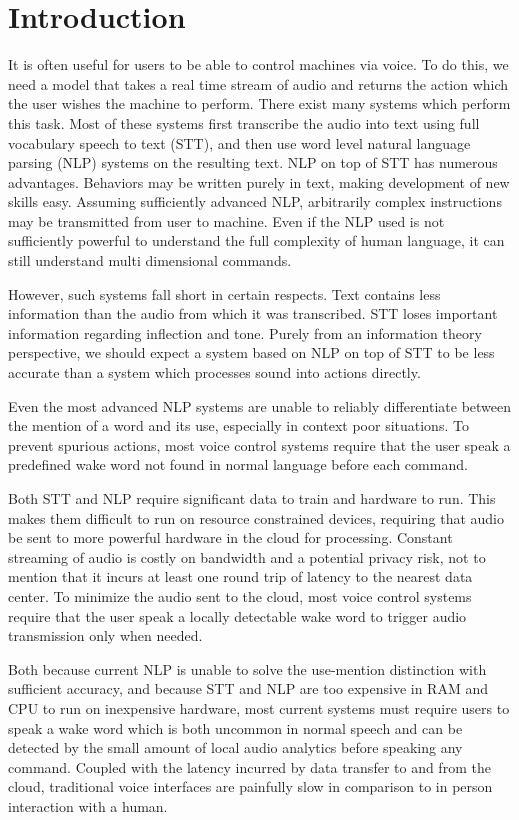 \documentclass[conference]{IEEEtran}
\begin{document}
\section{Introduction}
It is often useful for users to be able to control machines via voice.
To do this, we need a model that takes a real time stream of audio and returns the action which the user wishes the machine to perform.
There exist many systems which perform this task\cite{b1}\cite{b2}\cite{b3}.
Most of these systems first transcribe the audio into text using full vocabulary speech to text (STT),
and then use word level natural language parsing (NLP) systems on the resulting text\cite{b4}\cite{b5}.
NLP on top of STT has numerous advantages.
Behaviors may be written purely in text, making development of new skills easy.
Assuming sufficiently advanced NLP, arbitrarily complex instructions may be transmitted from user to machine.
Even if the NLP used is not sufficiently powerful to understand the full complexity of human language, it can still understand multi dimensional commands\cite{b6}.

However, such systems fall short in certain respects.
Text contains less information than the audio from which it was transcribed.
STT loses important information regarding inflection and tone.
Purely from an information theory perspective, we should expect a system based on NLP on top of STT to be less accurate than a system which processes sound into actions directly.

Even the most advanced NLP systems are unable to reliably differentiate between the mention of a word and its use, especially in context poor situations.
To prevent spurious actions, most voice control systems require that the user speak a predefined wake word not found in normal language before each command.

Both STT and NLP require significant data to train and hardware to run.
This makes them difficult to run on resource constrained devices, requiring that audio be sent to more powerful hardware in the cloud for processing.
Constant streaming of audio is costly on bandwidth and a potential privacy risk, not to mention that it incurs at least one round trip of latency to the nearest data center.
To minimize the audio sent to the cloud, most voice control systems require that the user speak a locally detectable wake word to trigger audio transmission only when needed.

Both because current NLP is unable to solve the use-mention distinction with sufficient accuracy,
and because STT and NLP are too expensive in RAM and CPU to run on inexpensive hardware,
most current systems must require users to speak a wake word which is both uncommon in normal speech
and can be detected by the small amount of local audio analytics before speaking any command.
Coupled with the latency incurred by data transfer to and from the cloud, traditional voice interfaces are painfully slow in comparison to in person interaction with a human.
\end{document}

